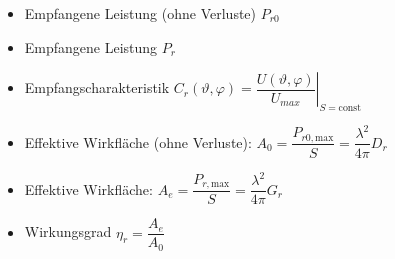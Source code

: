 \begin{itemize}
\begin{itemize}
            \itemsep0pt
            \item Empfangene Leistung (ohne Verluste) \(P_{r0}\)
            \item Empfangene Leistung \(P_r\)
            \item Empfangscharakteristik \(C_r(\vartheta, \varphi) = \left.\dfrac{U(\vartheta, \varphi)}{U_{max}}\right|_{S = \mathrm{const}}\)
            \item Effektive  Wirkfläche (ohne Verluste): \(A_0 = \dfrac{P_{r0,\mathrm{max}}}{S} = \dfrac{\lambda^2}{4\pi}D_r\)
            \item Effektive  Wirkfläche: \(A_e = \dfrac{P_{r,\mathrm{max}}}{S} = \dfrac{\lambda^2}{4\pi}G_r\)
            \item Wirkungsgrad \(\eta_r = \dfrac{A_e}{A_0}\)
        \end{itemize}

\end{itemize}
